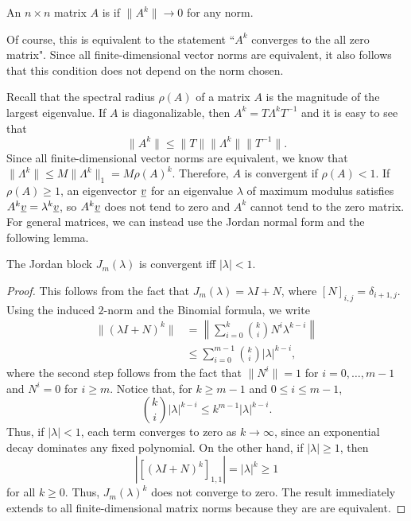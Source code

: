 \begin{definition}
An $n\times n$  matrix $A$ is  if $\| A^k \| \rightarrow 0$ for any norm.
\end{definition}
Of course, this is equivalent to the statement ``$A^k$ converges to the all zero matrix".
Since all finite-dimensional vector norms are equivalent, it also follows that this condition does not depend on the norm chosen.

Recall that the spectral radius $\rho(A)$ of a matrix $A$ is the magnitude of the largest eigenvalue.
If $A$ is diagonalizable, then $A^k = T \Lambda^k T^{-1}$ and it is easy to see that
\[ \| A^k \| \leq \| T \| \| \Lambda^k \| \| T^{-1} \|. \]
Since all finite-dimensional vector norms are equivalent, we know that $ \| \Lambda^k \| \leq M \| \Lambda^k \|_1 = M \rho(A)^k $.
Therefore, $A$ is convergent if $\rho(A)<1$.
If $\rho(A)\ge1$, an eigenvector $\underline v$ for an eigenvalue $\lambda$ of maximum modulus satisfies $A^k\underline v=\lambda^k\underline v$, so $A^k\underline v$ does not tend to zero and $A^k$ cannot tend to the zero matrix.
For general matrices, we can instead use the Jordan normal form and the following lemma.

\begin{lemma}
The Jordan block $J_m(\lambda)$ is convergent iff $|\lambda|<1$.
\end{lemma}
\begin{proof}
This follows from the fact that $J_m(\lambda)=\lambda I+N$, where
$[N]_{i,j}=\delta_{i+1,j}$.
Using the induced $2$-norm and the Binomial formula, we write
\begin{align*}
\|(\lambda I+N)^k\|
&=\left\|\sum_{i=0}^k \binom{k}{i}N^i\lambda^{k-i}\right\|\\
&\leq \sum_{i=0}^{m-1}\binom{k}{i}|\lambda|^{k-i},
\end{align*}
where the second step follows from the fact that $\|N^i\|=1$ for
$i=0,\ldots,m-1$ and $N^i=0$ for $i\geq m$.
Notice that, for $k\geq m-1$ and $0\leq i\leq m-1$,
\[
\binom{k}{i}|\lambda|^{k-i}
\leq k^{m-1}|\lambda|^{k-i}.
\]
Thus, if $|\lambda|<1$, each term converges to zero as $k\to\infty$,
since an exponential decay dominates any fixed polynomial.
On the other hand, if $|\lambda|\geq1$, then
\[
\left|[(\lambda I+N)^k]_{1,1}\right|
=|\lambda|^k\geq1
\]
for all $k\geq0$.
Thus, $J_m(\lambda)^k$ does not converge to zero.
The result immediately extends to all finite-dimensional matrix norms because they are are equivalent.
\end{proof}

